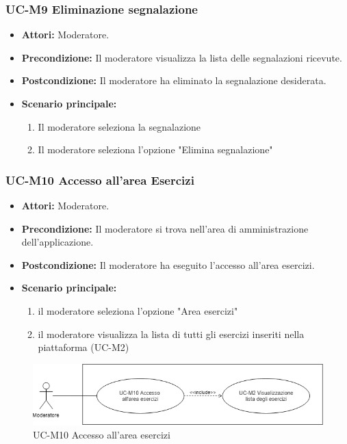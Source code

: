 \subsubsection{UC-M9 Eliminazione segnalazione}
\begin{itemize}
	\item \textbf{Attori:} Moderatore.
	\item \textbf{Precondizione:} Il moderatore visualizza la lista delle segnalazioni ricevute.
	\item \textbf{Postcondizione:} Il moderatore ha eliminato la segnalazione desiderata.
	\item \textbf{Scenario principale:}
	\begin{enumerate}
		\item Il moderatore seleziona la segnalazione
		\item Il moderatore seleziona l'opzione "Elimina segnalazione"
	\end{enumerate}
\end{itemize}

\subsubsection{UC-M10 Accesso all'area Esercizi}
\begin{itemize}
	\item \textbf{Attori:} Moderatore.
	\item \textbf{Precondizione:} Il moderatore si trova nell'area di amministrazione dell'applicazione.
	\item \textbf{Postcondizione:} Il moderatore ha eseguito l'accesso all'area esercizi.
	\item \textbf{Scenario principale:}
	\begin{enumerate}
		\item il moderatore seleziona l'opzione "Area esercizi"
		\item il moderatore visualizza la lista di tutti gli esercizi inseriti nella piattaforma (UC-M2)
	\end{enumerate}
\end{itemize}
\begin{figure}[h]
		\centering
		\includegraphics[scale=0.7]{images/UC-M10.png}
		\caption{UC-M10 Accesso all'area esercizi}
	\end{figure}	

